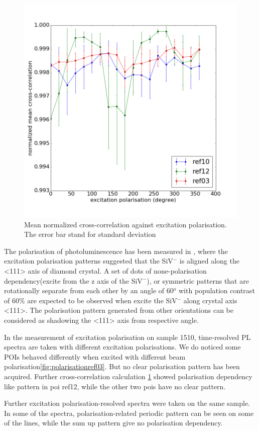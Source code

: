 \begin{figure}[h]
\centering
\includegraphics[width=0.7\linewidth]{"Figures/pic/excitation polarisation"}
\caption{Mean normalized cross-correlation against excitation polarisation. The error bar stand for standard deviation}
\label{fig:excitation-polarisation of untreated nanodiamond batch 2}
\end{figure}

The polarisation of photoluminescence has been measured in \cite{rogers_all-optical_2014}, where the excitation polarisation patterns suggested that the SiV$^{-}$ is aligned along the <111> axis of diamond crystal. A set of dots of none-polarisation dependency(excite from the z axis of the SiV$^{-}$), or symmetric patterns that are rotationally separate from each other by an angle of 60$^{o}$ with population contrast of 60$\%$ are expected to be observed when excite the SiV$^{-}$ along crystal axis <111>. The polarisation pattern generated from other orientations can be considered as shadowing the <111> axis from respective angle.

In the measurement of excitation polarisation on sample 1510, time-resolved PL spectra are taken with different excitation polarisations. We do noticed some POIs behaved differently when excited with different beam polarisation\ref{fig:polarisationref03}. But no clear polarisation pattern has been acquired. Further cross-correlation calculation \ref{fig:excitation-polarisation of untreated nanodiamond batch 2} showed polarisation dependency like pattern in poi ref12, while the other two pois have no clear pattern.

Further excitation polarisation-resolved spectra were taken on the same sample. In some of the spectra, polarisation-related periodic pattern can be seen on some of the lines, while the sum up pattern give no polarisation dependency.

